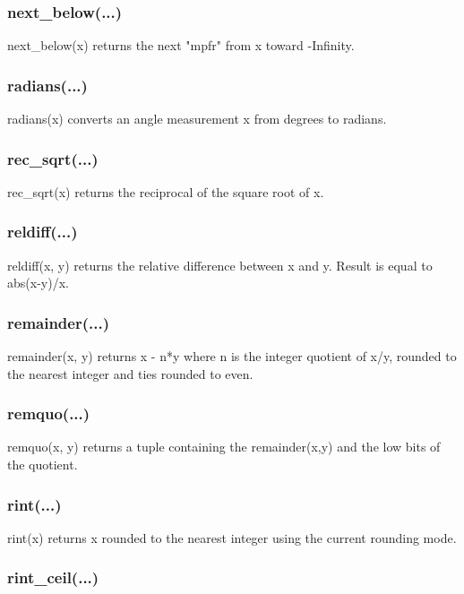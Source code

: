 \subsubsection{next\_below(...)}

next\_below(x) returns the next "mpfr" from x toward -Infinity.

\subsubsection{radians(...)}

radians(x) converts an angle measurement x from degrees to radians.

\subsubsection{rec\_sqrt(...)}

rec\_sqrt(x) returns the reciprocal of the square root of x.

\subsubsection{reldiff(...)}

reldiff(x, y) returns the relative difference between x and y. Result is equal to abs(x-y)/x.

\subsubsection{remainder(...)}

remainder(x, y) returns x - n*y where n is the integer quotient of x/y, rounded to the nearest
integer and ties rounded to even.

\subsubsection{remquo(...)}

remquo(x, y) returns a tuple containing the remainder(x,y) and the low bits of the quotient.

\subsubsection{rint(...)}

rint(x) returns x rounded to the nearest integer using the current rounding mode.

\subsubsection{rint\_ceil(...)}

